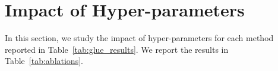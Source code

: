 \documentclass{article}
\newcommand{\basebase}{T5\textsubscript{\tiny BASE}\xspace}
\newcommand{\adapter}{\textsc{Adapter}\xspace}
\newcommand{\adapternoclf}{\textsc{Adapter}\xspace}
\newcommand{\compacter}{\textsc{Compacter}\xspace}
\newcommand{\compacteronlyff}{\textsc{Compacter}\texttt{++}\xspace} %
\newcommand{\compacternoclf}{\textsc{Compacter}\xspace}
\newcommand{\compacteronlyffnoclf}{\textsc{Compacter}\texttt{++}\xspace} %
\newcommand{\phmadapter}{\textsc{PHM-Adapter}\xspace}
\newcommand{\phmadapternoclf}{\textsc{PHM-Adapter}\xspace}
\newcommand{\intrinsic}{\textsc{Intrinsic-SAID}\xspace}
\newcommand{\prompttuningrandom}{\textsc{Prompt Tuning-R}\xspace}
\newcommand{\prompttuningtokens}{\textsc{Prompt Tuning-T}\xspace}
\newcommand{\pfeifferadapter}{\textsc{Pfeiffer-Adapter}\xspace}
\newcommand{\pfeifferadapternoclf}{\textsc{Pfeiffer-Adapter}\xspace}
\newcommand{\adapterdrop}{\textsc{AdapterDrop}\xspace}
\newcommand{\adapterdropnoclf}{\textsc{AdapterDrop}\xspace}
\newcommand{\bitfit}{\textsc{BitFit}\xspace}
\newcommand{\bitfitnoclf}{\textsc{BitFit}\xspace}
\begin{document}

\section{Impact of Hyper-parameters} \label{app:ablations}
In this section, we study the impact of hyper-parameters for each method reported in Table~\ref{tab:glue_results}. We report the results in Table~\ref{tab:ablations}.
\end{document}
